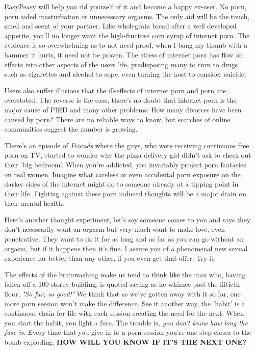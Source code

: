\documentclass[easypeasy.tex]{subfiles}
\begin{document}
EasyPeasy will help you rid yourself of it and become a happy ex-user. No porn, porn aided masturbation or unnecessary orgasms. The only aid will be the touch, smell and scent of your partner. Like wholegrain bread after a well developed appetite, you'll no longer want the high-fructose corn syrup of internet porn. The evidence is so overwhelming as to not need proof, when I bang my thumb with a hammer it hurts, it need not be proven. The stress of internet porn has flow on effects into other aspects of the users life, predisposing many to turn to drugs such as cigarettes and alcohol to cope, even turning the host to consider suicide.

Users also suffer illusions that the ill-effects of internet porn and porn are overstated. The reverse is the case, there's no doubt that internet porn is the major cause of PIED and many other problems. How many divorces have been caused by porn? There are no reliable ways to know, but searches of online communities suggest the number is growing.

There's an episode of \textit{Friends} where the guys, who were receiving continuous free porn on TV, started to wonder why the pizza delivery girl didn't ask to check out their 'big bedroom'. When you're addicted, you invariably project porn fantasies on real women. Imagine what careless or even accidental porn exposure on the darker sides of the internet might do to someone already at a tipping point in their life. Fighting against these porn induced thoughts will be a major drain on their mental health.

Here's another thought experiment, let's say someone comes to you and says they don't necessarily want an orgasm but very much want to make love, even penetrative. They want to do it for as long and as far as you can go without an orgasm, but if it happens then it's fine. I assure you of a phenomenal new sexual experience far better than any other, if you even get that offer. Try it.

The effects of the brainwashing make us tend to think like the man who, having fallen off a 100 storey building, is quoted saying as he whizzes past the fiftieth floor, \textit{"So far, so good!"} We think that as we've gotten away with it so far, one more porn session won't make the difference. See it another way, the 'habit' is a continuous chain for life with each session creating the need for the next. When you start the habit, you light a fuse. The trouble is, \textit{you don't know how long the fuse is.} Every time that you give in to a porn session you're one step closer to the bomb exploding. \textbf{HOW WILL YOU KNOW IF IT'S THE NEXT ONE?}
\end{document}
